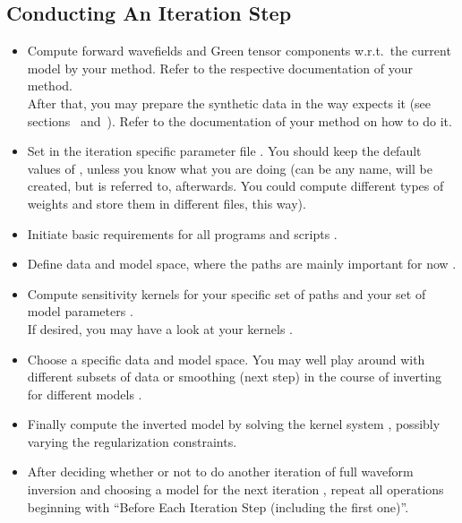\subsection*{Conducting An Iteration Step}
%
\begin{itemize}
\item Compute forward wavefields and Green tensor components w.r.t.\ the current model 
by your method. Refer to the respective documentation of your method.\\
After that, you may prepare the synthetic data in the way \ASKI{} expects it (see sections~ 
and~). Refer to the documentation of your method on how to do it.
%
\item Set  in the iteration specific parameter file 
.
You should keep the default values of ,
unless you know what you are doing (can be any name, will be created, but is referred to, afterwards. 
You could compute different types of weights and store them in different files, this way). 
%
\item Initiate basic requirements for all programs and scripts .
%
\item Define data and model space, where the paths are mainly important for now .
%
\item Compute sensitivity kernels for your specific set of paths and your set of model parameters 
  . \\
  If desired, you may have a look at your kernels .
%
\item Choose a specific data and model space. You may well play around with different subsets of data or
smoothing (next step) in the course of inverting for different models .
%
\item Finally compute the inverted model by solving the kernel system ,
  possibly varying the regularization constraints.
%
\item After deciding whether or not to do another iteration of full waveform inversion and choosing a model 
  for the next iteration , repeat all operations beginning 
  with ``Before Each Iteration Step (including the first one)''.
\end{itemize}
%
%
\newpage
